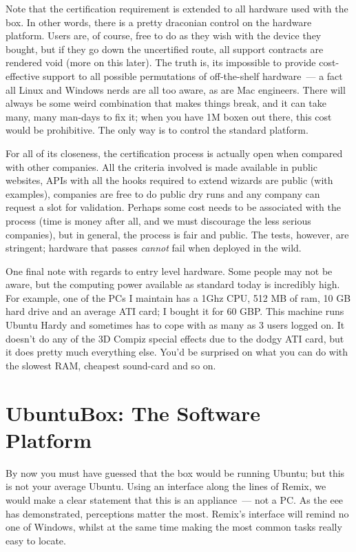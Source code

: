 \documentclass{memoir}
\begin{document}
Note that the certification requirement is extended to all hardware
used with the box. In other words, there is a pretty draconian control
on the hardware platform. Users are, of course, free to do as they
wish with the device they bought, but if they go down the uncertified
route, all support contracts are rendered void (more on this
later). The truth is, its impossible to provide cost-effective support
to all possible permutations of off-the-shelf hardware~--- a fact all
Linux and Windows nerds are all too aware, as are Mac engineers. There
will always be some weird combination that makes things break, and it
can take many, many man-days to fix it; when you have 1M boxen out
there, this cost would be prohibitive. The only way is to control the
standard platform.

For all of its closeness, the certification process is actually open
when compared with other companies. All the criteria involved is made
available in public websites, APIs with all the hooks required to
extend wizards are public (with examples), companies are free to do
public dry runs and any company can request a slot for
validation. Perhaps some cost needs to be associated with the process
(time is money after all, and we must discourage the less serious
companies), but in general, the process is fair and public. The tests,
however, are stringent; hardware that passes \emph{cannot} fail when
deployed in the wild.

One final note with regards to entry level hardware. Some people may
not be aware, but the computing power available as standard today is
incredibly high. For example, one of the PCs I maintain has a 1Ghz
CPU, 512 MB of ram, 10 GB hard drive and an average ATI card; I bought
it for 60 GBP. This machine runs Ubuntu Hardy and sometimes has to
cope with as many as 3 users logged on. It doesn't do any of the 3D
Compiz special effects due to the dodgy ATI card, but it does pretty
much everything else. You'd be surprised on what you can do with the
slowest RAM, cheapest sound-card and so on.

\section{UbuntuBox: The Software Platform}

By now you must have guessed that the box would be running Ubuntu; but
this is not your average Ubuntu. Using an interface along the lines of
Remix, we would make a clear statement that this is an appliance~---
not a PC. As the eee has demonstrated, perceptions matter the
most. Remix's interface will remind no one of Windows, whilst at the
same time making the most common tasks really easy to locate.
\end{document}
